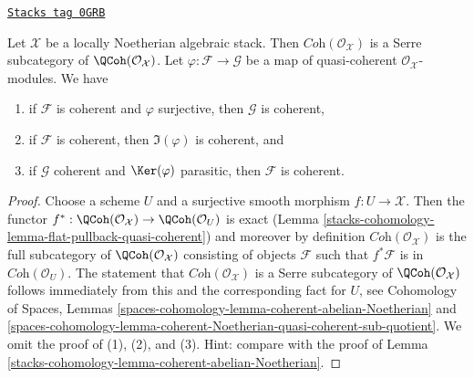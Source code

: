 \begin{lemma}
\label{stacks-cohomology-lemma-coherent-Noetherian-quasi-coherent-sub-quotient}
\href{https://stacks.math.columbia.edu/tag/0GRB}{\texttt{Stacks tag 0GRB}}

Let $\mathcal{X}$ be a locally Noetherian algebraic stack.
Then $\textit{Coh}(\mathcal{O}_\mathcal{X})$ is a Serre subcategory of
$\QCoh(\mathcal{O}_\mathcal{X})$. Let $\varphi : \mathcal{F} \to \mathcal{G}$
be a map of quasi-coherent $\mathcal{O}_\mathcal{X}$-modules. We have
\begin{enumerate}
\item if $\mathcal{F}$ is coherent and $\varphi$ surjective,
then $\mathcal{G}$ is coherent,
\item if $\mathcal{F}$ is coherent, then $\Im(\varphi)$ is coherent, and
\item if $\mathcal{G}$ coherent and $\Ker(\varphi)$ parasitic, then
$\mathcal{F}$ is coherent.
\end{enumerate}
\end{lemma}

\begin{proof}
Choose a scheme $U$ and a surjective smooth morphism $f : U \to \mathcal{X}$.
Then the functor
$f^* : \QCoh(\mathcal{O}_\mathcal{X}) \to \QCoh(\mathcal{O}_U)$
is exact (Lemma \ref{stacks-cohomology-lemma-flat-pullback-quasi-coherent})
and moreover by definition $\textit{Coh}(\mathcal{O}_\mathcal{X})$
is the full subcategory of $\QCoh(\mathcal{O}_\mathcal{X})$ consisting
of objects $\mathcal{F}$ such that $f^*\mathcal{F}$ is in
$\textit{Coh}(\mathcal{O}_U)$. The statement that
$\textit{Coh}(\mathcal{O}_\mathcal{X})$ is a Serre subcategory of
$\QCoh(\mathcal{O}_\mathcal{X})$ follows immediately from this
and the corresponding fact for $U$, see
Cohomology of Spaces, Lemmas
\ref{spaces-cohomology-lemma-coherent-abelian-Noetherian} and
\ref{spaces-cohomology-lemma-coherent-Noetherian-quasi-coherent-sub-quotient}.
We omit the proof of (1), (2), and (3). Hint: compare
with the proof of Lemma \ref{stacks-cohomology-lemma-coherent-abelian-Noetherian}.
\end{proof}

